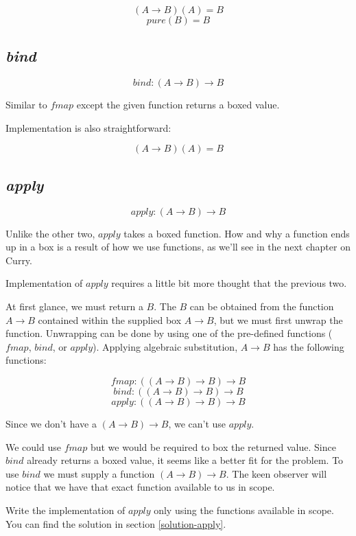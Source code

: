 \documentclass{shpdocumentation}
\begin{document}
\[ (A \to B)(A) = B \]
\[ pure(B) = \boxed{B} \]

\subsection{\textit{bind}}

\[ bind\colon (A \to \boxed{B}) \to \boxed{B} \]

Similar to $fmap$ except the given function returns a boxed value.

Implementation is also straightforward:

\[ (A \to \boxed{B})(A) = \boxed{B} \]

\subsection{\textit{apply}}

\[ apply\colon (\boxed{A \to B}) \to \boxed{B} \]

Unlike the other two, $apply$ takes a boxed function.  How and why a function ends up in a box is a result of how we use functions, as we'll see in the next chapter on Curry.

Implementation of $apply$ requires a little bit more thought that the previous two.

At first glance, we must return a $\boxed{B}$.  The $B$ can be obtained from the function $A \to B$ contained within the supplied box $\boxed{A \to B}$, but we must first unwrap the function.  Unwrapping can be done by using one of the pre-defined functions ($fmap$, $bind$, or $apply$).  Applying algebraic substitution, $\boxed{A \to B}$ has the following functions:

\[ fmap\colon ((A \to B) \to B) \to \boxed{B} \]
\[ bind\colon ((A \to B) \to \boxed{B}) \to \boxed{B} \]
\[ apply\colon (\boxed{(A \to B) \to B}) \to \boxed{B} \]

Since we don't have a $\boxed{(A \to B) \to B}$, we can't use $apply$.

We could use $fmap$ but we would be required to box the returned value.  Since $bind$ already returns a boxed value, it seems like a better fit for the problem. To use $bind$ we must supply a function $(A \to B) \to \boxed{B}$. The keen observer will notice that we have that exact function available to us in scope.

Write the implementation of $apply$ only using the functions available in scope.  You can find the solution in section \ref{solution-apply}.
\end{document}
